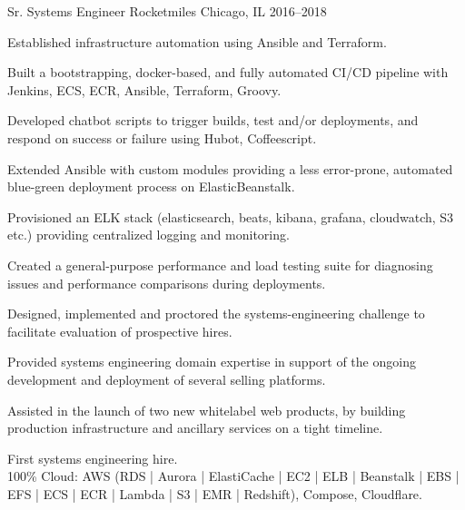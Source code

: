 \begin{cventries}
  \cventry
    {Sr. Systems Engineer} %
    {Rocketmiles} %
    {Chicago, IL} %
    {2016--2018} %
    {
      \begin{cvitems} %
        \item {Established infrastructure automation using Ansible and Terraform.}
        \item {Built a bootstrapping, docker-based, and fully automated CI/CD pipeline with Jenkins, ECS, ECR, Ansible, Terraform, Groovy.}
        \item {Developed chatbot scripts to trigger builds, test and/or deployments, and respond on success or failure using Hubot, Coffeescript.}
        \item {Extended Ansible with custom modules providing a less error-prone, automated blue-green deployment process on ElasticBeanstalk.}
        \item {Provisioned an ELK stack (elasticsearch, beats, kibana, grafana, cloudwatch, S3 etc.) providing centralized logging and monitoring.}
        \item {Created a general-purpose performance and load testing suite for diagnosing issues and performance comparisons during deployments.}
        \item {Designed, implemented and proctored the systems-engineering challenge to facilitate evaluation of prospective hires.}
        \item {Provided systems engineering domain expertise in support of the ongoing development and deployment of several selling platforms.}
        \item {Assisted in the launch of two new whitelabel web products, by building production infrastructure and ancillary services on a tight timeline.}
      \end{cvitems}
    }
    {
      \begin{cventrysummary} %
        First systems engineering hire. \\
        100\% Cloud: AWS (RDS | Aurora | ElastiCache | EC2 | ELB | Beanstalk | EBS | EFS | ECS | ECR | Lambda | S3 | EMR | Redshift), Compose, Cloudflare.
      \end{cventrysummary}
    }


\end{cventries}
